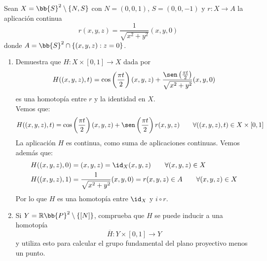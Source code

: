 \documentclass[12pt]{article}
\begin{document}
    \begin{ejercicio}
        Sean $X=\bb{S}^2\setminus \{N,S\}$ con $N = (0,0,1)$, $S=(0,0,-1)$ y $r:X\to A$ la aplicación continua
        \begin{equation*}
            r(x,y,z) = \frac{1}{\sqrt{x^2+y^2}}(x,y,0)
        \end{equation*}
        donde $A=\bb{S}^2\cap \{(x,y,z) : z=0\}$.
        \begin{enumerate}[label=\alph*)]
            \item Demuestra que $H:X\times [0,1]\to X$ dada por
                \begin{equation*}
                    H((x,y,z),t) = \cos\left(\frac{\pi t}{2}\right)(x,y,z) + \frac{\sen\left(\frac{\pi t}{2}\right)}{\sqrt{x^2+y^2}}(x,y,0)
                \end{equation*}
                es una homotopía entre $r$ y la identidad en $X$.\\

                Vemos que:
                \begin{equation*}
                    H((x,y,z),t) = \cos\left(\frac{\pi t}{2}\right)(x,y,z) + \sen\left(\frac{\pi t}{2}\right)r(x,y,z) \qquad \forall ((x,y,z),t)\in X\times [0,1]
                \end{equation*}
                La aplicación $H$ es continua, como suma de aplicaciones continuas. Vemos además que:
                \begin{align*}
                    H((x,y,z),0) &= (x,y,z) = \id_X(x,y,z) \qquad \forall (x,y,z)\in X \\
                    H((x,y,z),1) &= \frac{1}{\sqrt{x^2+y^2}}(x,y,0) = r(x,y,z) \in A \qquad \forall (x,y,z)\in X
                \end{align*}
                Por lo que $H$ es una homotopía entre $\id_X$ y $i\circ r$.
            \item Si $Y=\mathbb{R}\bb{P}^2\setminus \{[N]\}$, comprueba que $H$ se puede inducir a una homotopía 
                \begin{equation*}
                    \overline{H}:Y\times [0,1]\to Y
                \end{equation*}
                    y utiliza esto para calcular el grupo fundamental del plano proyectivo menos un punto.\\


\end{enumerate}
\end{ejercicio}
\end{document}
